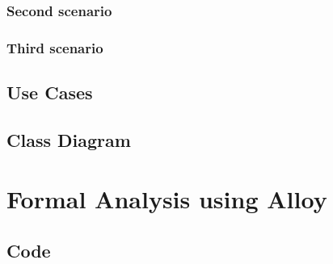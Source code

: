 \documentclass[12pt]{article}
\begin{document}
	\subsubsection{Second scenario}
	
	\FloatBarrier
	\clearpage
	\subsubsection{Third scenario}
	
	\FloatBarrier
	\clearpage
	\subsection{Use Cases}
	
	\subsection{Class Diagram}
	

	\section{Formal Analysis using Alloy}
	
	\subsection{Code}
	
\end{document}
